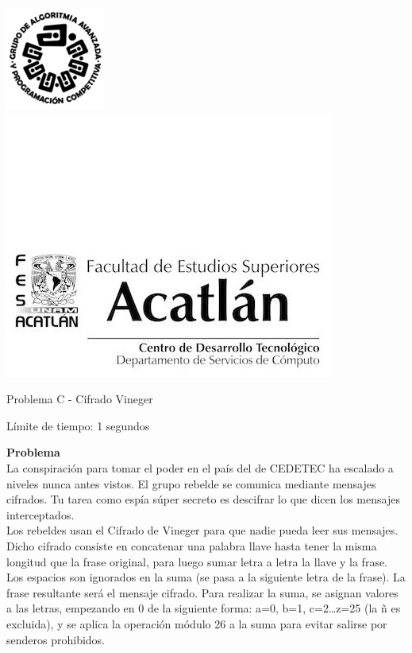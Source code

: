 \includegraphics[scale=0.6]{logo} \hspace*{9.00cm}
\includegraphics[scale=0.5]{dsc} 
\begin{center}
	\Large Problema C - Cifrado Vineger
\end{center}

\begin{flushright}
Límite de tiempo: 1 segundos
\par\end{flushright}

\textbf{Problema}\\
La conspiración para tomar el poder en el país del de CEDETEC ha escalado a niveles nunca antes vistos. El grupo rebelde se comunica mediante mensajes cifrados. Tu tarea como espía súper secreto es descifrar lo que dicen los mensajes interceptados.\\
Los rebeldes usan el Cifrado de Vineger para que nadie pueda leer sus mensajes. Dicho cifrado consiste en concatenar una palabra llave hasta tener la misma longitud que la frase original, para luego sumar letra a letra la llave y la frase. Los espacios son ignorados en la suma (se pasa a la siguiente letra de la frase).
La frase resultante será el mensaje cifrado.
Para realizar la suma, se asignan valores a las letras, empezando en 0 de la siguiente forma: a=0, b=1, c=2\ldots z=25 (la ñ es excluida), y se aplica la operación módulo 26 a la suma para evitar salirse por senderos prohibidos. 

